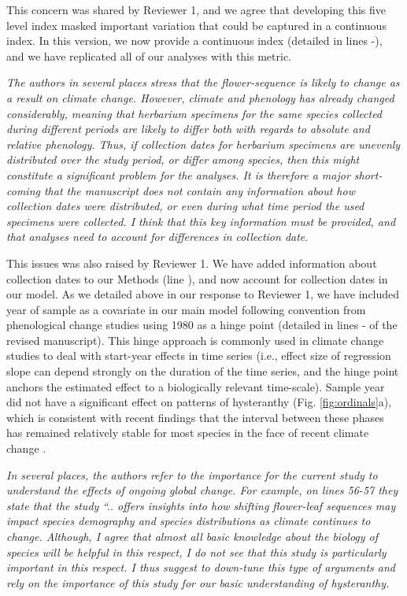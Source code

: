 \documentclass{article}[12pt]
\begin{document}
This concern was shared by Reviewer 1, and we agree that developing this five level index masked important variation that could be captured in a continuous index. In this version, we now provide a continuous index (detailed in lines -), and we have replicated all of our analyses with this metric.

\emph{The authors in several places stress that the flower-sequence is likely to change as a result on climate change. However, climate and phenology has already changed considerably, meaning that herbarium specimens for the same species collected during different periods are likely to differ both with regards to absolute and relative phenology. Thus, if collection dates for herbarium specimens are unevenly distributed over the study period, or differ among species, then this might constitute a significant problem for the analyses. It is therefore a major short-coming that the manuscript does not contain any information about how collection dates were distributed, or even during what time period the used specimens were collected. I think that this key information must be provided, and that analyses need to account for differences in collection date}.

This issues was also raised by Reviewer 1. We have added information about collection dates to our Methods (line ), and now account for collection dates in our model. As we detailed above in our response to  Reviewer 1, we have included year of sample as a covariate in our main model following convention from phenological change studies using 1980 as a hinge point (detailed in lines - of the revised manuscript).  This hinge approach is commonly used in climate change studies to deal with start-year effects in time series (i.e., effect size of regression slope can depend strongly on the duration of the time series, and the hinge point anchors the estimated effect to a biologically relevant time-scale). Sample year did not have a significant effect on patterns of hysteranthy (Fig. \ref{fig:ordinals}a), which is consistent with recent findings that the interval between these phases has remained relatively stable for most species in the face of recent climate change \citep{Guo:2023wb}. 

\emph{In several places, the authors refer to the importance for the current study to understand the effects of ongoing global change. For example, on lines 56-57 they state that the study “.. offers insights into how shifting flower-leaf sequences may impact species demography and species distributions as climate continues to change. Although, I agree that almost all basic knowledge about the biology of species will be helpful in this respect, I do not see that this study is particularly important in this respect. I thus suggest to down-tune this type of arguments and rely on the importance of this study for our basic understanding of hysteranthy.}
\end{document}
